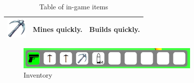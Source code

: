 \begin{table}[h]
\begin{tabular}{|c|p{5cm}|p{5cm}|}
        \hline
        \includegraphics[width=1cm]{chapters/user_manual/resources/pickaxe-fast.png} & Mines quickly.                                                                        & Builds quickly.     \\
        \hline
    \end{tabular}
    \caption{Table of in-game items}
    \label{tab:mytable}
\end{table}

\begin{figure}[h]
    \centering
    \includegraphics[width=0.8\textwidth]{chapters/user_manual/resources/inventory.png}
    \caption{Inventory}
    \label{fig:inventory}
\end{figure}